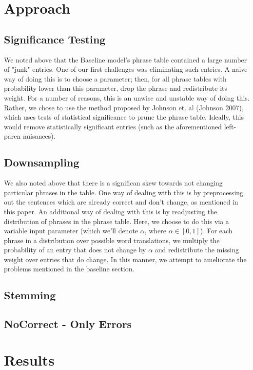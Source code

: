 \documentclass[11pt,letterpaper]{article}
\begin{document}
\section{Approach}
\subsection{Significance Testing}
\indent We noted above that the Baseline model's phrase table contained a large number of "junk" entries.
One of our first challenges was eliminating such entries. A naive way of doing this is to choose a parameter; then, for all 
phrase tables with probability lower than this parameter, drop the phrase and redistribute its weight. For a 
number of reasons, this is an unwise and unstable way of doing this. Rather, we chose to use the method
 proposed by Johnson et. al (Johnson 2007), which uses tests of statistical significance to prune the phrase table. 
 Ideally, this would remove statistically significant entries (such as the aforementioned left-paren nuisances). \newline
\subsection{Downsampling}
\indent We also noted above that there is a significan skew towards not changing particular phrases in the table. One way of
 dealing with this is by preprocessing out the sentences which are already correct and don't change, as mentioned in this paper. 
 An additional way of dealing with this is by readjusting the distribution of phrases in the phrase table. Here, we choose to
  do this via a variable input parameter (which we'll denote $\alpha$, where $\alpha \in [0,1]$). For each phrase in
   a distribution over possible word translations, we multiply the probability  of an entry that does not change by $\alpha$ 
   and redistribute the missing weight over entries that do change. In this manner, we attempt to ameliorate the problems 
   mentioned in the baseline section. \newline
\subsection{Stemming}
\subsection{NoCorrect - Only Errors}

\section{Results}
\end{document}
